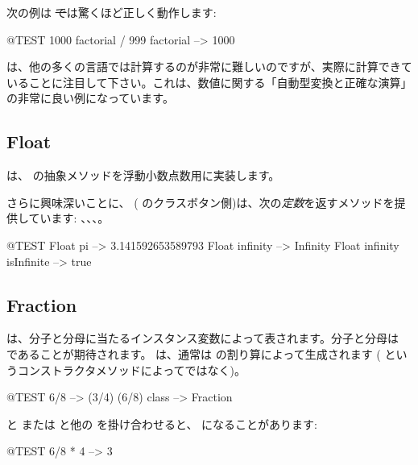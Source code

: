 \documentclass[a4paper,10pt,twoside]{book}
\begin{document}
次の例は \st では驚くほど正しく動作します:
\begin{code}{@TEST}
1000 factorial / 999 factorial --> 1000
\end{code}
 は、他の多くの言語では計算するのが非常に難しいのですが、実際に計算できていることに注目して下さい。これは、数値に関する「自動型変換と正確な演算」の非常に良い例になっています。


\subsection{Float}

 は、 の抽象メソッドを浮動小数点数用に実装します。

さらに興味深いことに、 (\ie{} のクラスボタン側)は、次の\emph{定数}を返すメソッドを提供しています: 、、、。

\begin{code}{@TEST}
Float pi                      --> 3.141592653589793
Float infinity               --> Infinity
Float infinity isInfinite --> true
\end{code}

\subsection{Fraction}

 は、分子と分母に当たるインスタンス変数によって表されます。分子と分母は  であることが期待されます。 は、通常は  の割り算によって生成されます ( というコンストラクタメソッドによってではなく)。

\begin{code}{@TEST}
6/8             --> (3/4)
(6/8) class --> Fraction
\end{code}

 と  または  と他の  を掛け合わせると、 になることがあります:

\begin{code}{@TEST}
6/8 * 4 --> 3
\end{code}
\end{document}
